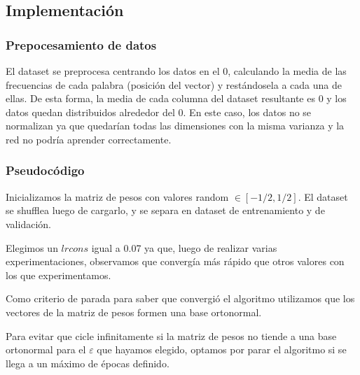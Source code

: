 \subsection{Implementación}

\subsubsection{Prepocesamiento de datos}

El dataset se preprocesa centrando los datos en el 0, calculando la media de las frecuencias de cada palabra (posición del vector) y restándosela a cada una de ellas. De esta forma, la media de cada columna del dataset resultante es 0 y los datos quedan distribuidos alrededor del 0. En este caso, los datos no se normalizan ya que quedarían todas las dimensiones con la misma varianza y la red no podría aprender correctamente.

\subsubsection{Pseudocódigo}

Inicializamos la matriz de pesos con valores random $\in[-1/2, 1/2]$. El dataset se shufflea luego de cargarlo, y se separa en dataset de entrenamiento y de validación.

Elegimos un $lrcons$ igual a 0.07 ya que, luego de realizar varias experimentaciones, observamos que convergía más rápido que otros valores con los que experimentamos.


Como criterio de parada para saber que convergió el algoritmo utilizamos que los vectores de la matriz de pesos formen una base ortonormal. 

Para evitar que cicle infinitamente si la matriz de pesos no tiende a una base ortonormal para el $\varepsilon$ que hayamos elegido, optamos por parar el algoritmo si se llega a un máximo de épocas definido.

